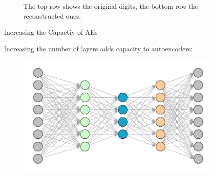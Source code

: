 {\begin{figure}
    \caption{The top row shows the original digits, the bottom row the reconstructed ones.}
    
  \end{figure}
  
  \vspace{-0.3cm}
  
  \begin{itemize}
  
    
  \end{itemize}
  
}

\begin{vbframe}{Increasing the Capactiy of AEs}

Increasing the number of layers adds capacity to autoencoders: 


  \begin{figure}
  \centering
  \includegraphics[width=0.9\textwidth]{plots/AE_increased_capacity.png}
  \end{figure}


\end{vbframe}

